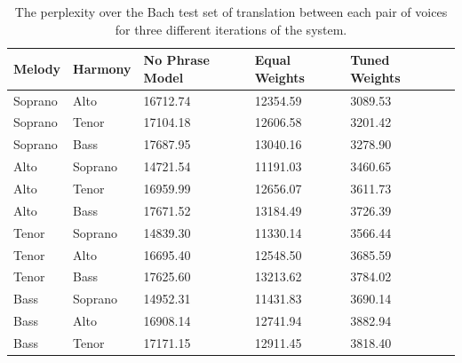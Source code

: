 \documentclass{sig-alternate}
\begin{document}
\begin{table}[t]
      \begin{tabular}{| l | l | l | l | l | l |}
      \hline
     Melody & Harmony & No Phrase Model & Equal Weights & Tuned Weights \\ \hline
     Soprano & Alto & 16712.74 & 12354.59 & 3089.53 \\ 
     Soprano & Tenor & 17104.18 & 12606.58 & 3201.42 \\ 
     Soprano & Bass & 17687.95 & 13040.16 & 3278.90 \\ 
     Alto & Soprano & 14721.54 & 11191.03 & 3460.65 \\ 
     Alto & Tenor & 16959.99 & 12656.07 & 3611.73 \\ 
     Alto & Bass & 17671.52 & 13184.49 & 3726.39 \\ 
     Tenor & Soprano & 14839.30 & 11330.14 & 3566.44 \\ 
     Tenor & Alto & 16695.40 & 12548.50 & 3685.59 \\ 
     Tenor & Bass & 17625.60 & 13213.62 & 3784.02 \\ 
     Bass & Soprano & 14952.31 & 11431.83 & 3690.14 \\ 
     Bass & Alto & 16908.14 & 12741.94 & 3882.94 \\ 
     Bass & Tenor & 17171.15 & 12911.45 & 3818.40 \\ \hline
      \end{tabular}
  \caption{The perplexity over the Bach test set of translation between each pair of voices for three different iterations of the system.}
\end{table}
\end{document}
